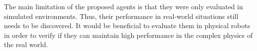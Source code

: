 The main limitation of the proposed agents is that they were only evaluated in simulated environments. Thus, their performance in real-world situations still needs to be discovered. It would be beneficial to evaluate them in physical robots in order to verify if they can maintain high performance in the complex physics of the real world.


